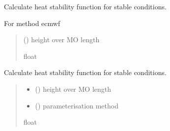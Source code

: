 \documentclass[letterpaper,10pt,english]{sphinxmanual}
\begin{document}
\begin{fulllineitems}

\pysigstartsignatures
{}
\pysigstopsignatures
\sphinxAtStartPar
Calculate heat stability function for stable conditions.

\sphinxAtStartPar
For method ecmwf
\begin{quote}\begin{description}
\sphinxAtStartPar
{} () \textendash{} height over MO length

\sphinxAtStartPar
{}

\sphinxAtStartPar
float

\end{description}\end{quote}

\end{fulllineitems}



\begin{fulllineitems}

\pysigstartsignatures
{}
\pysigstopsignatures
\sphinxAtStartPar
Calculate heat stability function for stable conditions.
\begin{quote}\begin{description}
\begin{itemize}
\item {} 
\sphinxAtStartPar
{} () \textendash{} height over MO length

\item {} 
\sphinxAtStartPar
{} () \textendash{} parameterisation method

\end{itemize}

\sphinxAtStartPar
{}

\sphinxAtStartPar
float

\end{description}\end{quote}

\end{fulllineitems}
\end{document}
